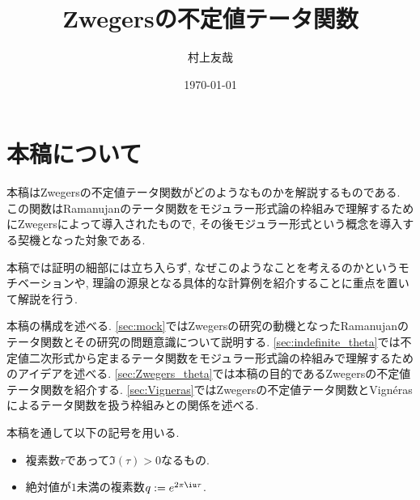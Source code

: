 \documentclass[11pt,b5paper,oneside,lualatex]{ltjsarticle} %
\numberwithin{equation}{section} %
\begin{document}

\title{Zwegersの不定値テータ関数}
\author{村上友哉}
\date{\today}

\maketitle

\tableofcontents


\section{本稿について} \label{sec:intro}


本稿はZwegersの不定値テータ関数がどのようなものかを解説するものである. 
この関数はRamanujanのテータ関数をモジュラー形式論の枠組みで理解するためにZwegersによって導入されたもので, その後モジュラー形式という概念を導入する契機となった対象である. 

本稿では証明の細部には立ち入らず, なぜこのようなことを考えるのかというモチベーションや, 理論の源泉となる具体的な計算例を紹介することに重点を置いて解説を行う.

本稿の構成を述べる. 
\cref{sec:mock}ではZwegersの研究の動機となったRamanujanのテータ関数とその研究の問題意識について説明する.
\cref{sec:indefinite_theta}では不定値二次形式から定まるテータ関数をモジュラー形式論の枠組みで理解するためのアイデアを述べる. 
\cref{sec:Zwegers_theta}では本稿の目的であるZwegersの不定値テータ関数を紹介する. 
\cref{sec:Vigneras}ではZwegersの不定値テータ関数とVign\'{e}rasによるテータ関数を扱う枠組みとの関係を述べる. 

本稿を通して以下の記号を用いる. 

\begin{symb}
	\begin{itemize}
		\item 複素数$ \tau $であって$ \Im(\tau) > 0 $なるもの.
		\item 絶対値が$ 1 $未満の複素数$ q := e^{2\pi\iu\tau} $.
	\end{itemize}
\end{symb}

\end{document}
